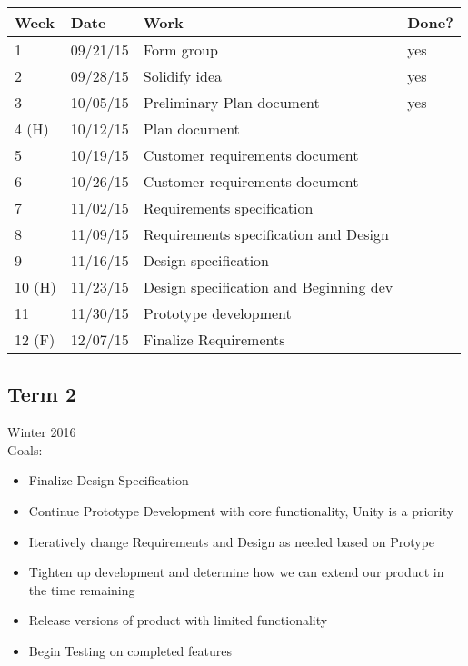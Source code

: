 \documentclass[12pt]{article}
\begin{document}
\begin{table}[H]
\centering
\begin{tabular}{|l|l|l|l|}
\hline
Week 	& Date	 		& Work	 		& 	Done?	 \\ \hline
1		& 09/21/15	 	& Form group		& 	yes		 \\ \hline
2		& 09/28/15	 	& Solidify idea	& 	yes		 \\ \hline
3		& 10/05/15	 	& Preliminary Plan document	& 	yes		 \\ \hline
4 (H)	& 10/12/15	 	& Plan document	& 			 \\ \hline
5		& 10/19/15	 	& Customer requirements document		& 			 \\ \hline
6		& 10/26/15	 	& Customer requirements document		& 			 \\ \hline
7		& 11/02/15	 	& Requirements specification	& 			 \\ \hline
8		& 11/09/15	 	& Requirements specification and Design		& 			 \\ \hline
9		& 11/16/15	 	& Design specification		& 			 \\ \hline
10 (H)	& 11/23/15	 	& Design specification and Beginning dev		& 			 \\ \hline
11		& 11/30/15	 	& Prototype development	& 			 \\ \hline
12 (F)	& 12/07/15	 	& Finalize Requirements		& 			 \\ \hline
\end{tabular}
\end{table}

\subsection{Term 2}
Winter 2016 \\
Goals:
\begin{itemize}
	\item Finalize Design Specification
	\item Continue Prototype Development with core functionality, Unity is a priority
	\item Iteratively change Requirements and Design as needed based on Protype
	\item Tighten up development and determine how we can extend our product in the time remaining
	\item Release versions of product with limited functionality
	\item Begin Testing on completed features
\end{itemize}
\end{document}
